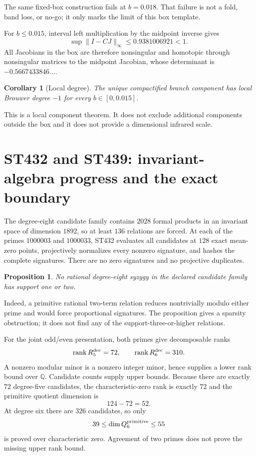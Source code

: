 \documentclass[11pt,a4paper]{article}
\newtheorem{proposition}{Proposition}
\newtheorem{corollary}{Corollary}
\begin{document}
The same fixed-box construction fails at $b=0.018$.  That failure is not a
fold, band loss, or no-go; it only marks the limit of this box template.

For $b\le0.015$, interval left multiplication by the midpoint inverse gives
\[
 \sup\|I-CJ\|_\infty\le0.9381006921<1.
\]
All Jacobians in the box are therefore nonsingular and homotopic through
nonsingular matrices to the midpoint Jacobian, whose determinant is
$-0.5667433846\ldots$.

\begin{corollary}[Local degree]
The unique compactified branch component has local Brouwer degree $-1$ for
every $b\in[0,0.015]$.
\end{corollary}

This is a local component theorem.  It does not exclude additional components
outside the box and it does not provide a dimensional infrared scale.

\section{ST432 and ST439: invariant-algebra progress and the exact boundary}

The degree-eight candidate family contains $2028$ formal products in an
invariant space of dimension $1892$, so at least $136$ relations are forced.
At each of the primes $1000003$ and $1000033$, ST432 evaluates all candidates
at $128$ exact mean-zero points, projectively normalizes every nonzero
signature, and hashes the complete signatures.  There are no zero signatures
and no projective duplicates.

\begin{proposition}
No rational degree-eight syzygy in the declared candidate family has support
one or two.
\end{proposition}

Indeed, a primitive rational two-term relation reduces nontrivially modulo
either prime and would force proportional signatures.  The proposition gives
a sparsity obstruction; it does not find any of the support-three-or-higher
relations.

For the joint odd/even presentation, both primes give decomposable ranks
\[
 \operatorname{rank}R_5^{\rm dec}=72,
 \qquad \operatorname{rank}R_6^{\rm dec}=310.
\]
A nonzero modular minor is a nonzero integer minor, hence supplies a lower
rank bound over $\mathbb Q$.  Candidate counts supply upper bounds.  Because
there are exactly $72$ degree-five candidates, the characteristic-zero rank
is exactly $72$ and the primitive quotient dimension is
\[
 124-72=52.
\]
At degree six there are $326$ candidates, so only
\[
 39\le\dim Q_6^{\rm primitive}\le55
\]
is proved over characteristic zero.  Agreement of two primes does not prove
the missing upper rank bound.
\end{document}

